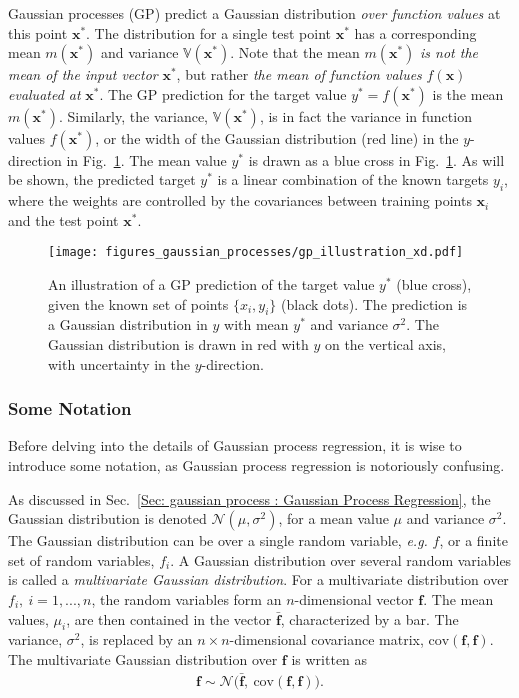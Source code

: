 \documentclass[twoside,english]{uiofysmaster}
\begin{document}
Gaussian processes (GP) predict a Gaussian distribution \textit{over function values} at this point $\textbf{x}^*$. The distribution for a single test point $\textbf{x}^*$ has a corresponding mean $m(\textbf{x}^*)$ and variance $\mathbb{V}(\textbf{x}^*)$. Note that the mean $m(\textbf{x}^*)$ \textit{is not the mean of the input vector} $\textbf{x}^*$, but rather \textit{the mean of function values} $f(\textbf{x})$ \textit{evaluated at} $\textbf{x}^*$. The GP prediction for the target value $y^*=f(\textbf{x}^*)$ is the mean $m(\textbf{x}^*)$. Similarly, the variance, $\mathbb{V}(\textbf{x}^*)$, is in fact the variance in function values $f(\textbf{x}^*)$, or the width of the Gaussian distribution (red line) in the $y$-direction in Fig.~\ref{Fig:: gaussian process : GP illustration}. The mean value $y^*$ is drawn as a blue cross in Fig.~\ref{Fig:: gaussian process : GP illustration}. As will be shown, the predicted target $y^*$ is a linear combination of the known targets $y_i$, where the weights are controlled by the covariances between training points $\textbf{x}_i$ and the test point $\textbf{x}^*$.  


\begin{figure}
\centering
\texttt{[image: figures\_gaussian\_processes/gp\_illustration\_xd.pdf]}
\caption{An illustration of a GP prediction of the target value $y^*$ (blue cross), given the known set of points $\{x_i, y_i\}$ (black dots). The prediction is a Gaussian distribution in $y$ with mean $y^*$ and variance $\sigma^2$. The Gaussian distribution is drawn in red with $y$ on the vertical axis, with uncertainty in the $y$-direction.}
\label{Fig:: gaussian process : GP illustration}
\end{figure}

\subsubsection{Some Notation}

Before delving into the details of Gaussian process regression, it is wise to introduce some notation, as Gaussian process regression is notoriously confusing. 

As discussed in Sec.~\ref{Sec: gaussian process : Gaussian Process Regression}, the Gaussian distribution is denoted $\mathcal{N}(\mu, \sigma^2)$, for a mean value $\mu$ and variance $\sigma^2$. The Gaussian distribution can be over a single random variable, \textit{e.g.} $f$, or a finite set of random variables, $f_i$. A Gaussian distribution over several random variables is called a \textit{multivariate Gaussian distribution}. For a multivariate distribution over $f_i, ~i=1,...,n$, the random variables form an $n$-dimensional vector $\textbf{f}$. The mean values, $\mu_i$, are then contained in the vector $\bar{\textbf{f}}$, characterized by a bar. The variance, $\sigma^2$, is replaced by an $n \times n$-dimensional covariance matrix, $\text{cov}(\textbf{f}, \textbf{f})$. The multivariate Gaussian distribution over $\textbf{f}$ is written as
\begin{align}
\textbf{f} \sim \mathcal{N} \Big(\bar{\textbf{f}}, ~\text{cov}(\textbf{f},\textbf{f})  \Big).
\end{align}  
\end{document}
